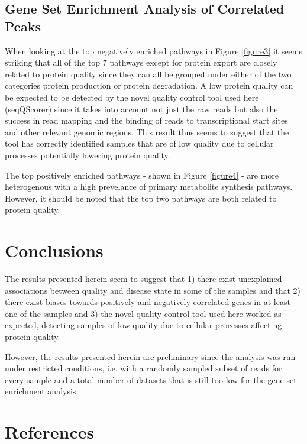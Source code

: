 \documentclass[5p]{elsarticle}
\begin{document}
\subsection{Gene Set Enrichment Analysis of Correlated Peaks}
When looking at the top negatively enriched pathways in Figure \ref{figure3} it seems striking that all of the top 7 pathways except for protein export are closely related to protein quality since they can all be grouped under either of the two categories protein production or protein degradation. A low protein quality can be expected to be detected by the novel quality control tool used here (seqQScorer) since it takes into account not just the raw reads but also the success in read mapping and the binding of reads to transcriptional start sites and other relevant genomic regions. This result thus seems to suggest that the tool has correctly identified samples that are of low quality due to cellular processes potentially lowering protein quality.

The top positively enriched pathways - shown in Figure \ref{figure4} - are more heterogenous with a high prevelance of primary metabolite synthesis pathways. However, it should be noted that the top two pathways are both related to protein quality.

\section{Conclusions}
 The results presented herein seem to suggest that 1) there exist unexplained associations between quality and disease state in some of the samples and that 2) there exist biases towards positively and negatively correlated genes in at least one of the samples and 3) the novel quality control tool used here worked as expected, detecting samples of low quality due to cellular processes affecting protein quality.

 However, the results presented herein are preliminary since the analysis was run under restricted conditions, i.e. with a randomly sampled subset of reads for every sample and a total number of datasets that is still too low for the gene set enrichment analysis.

\section*{References}
\end{document}
